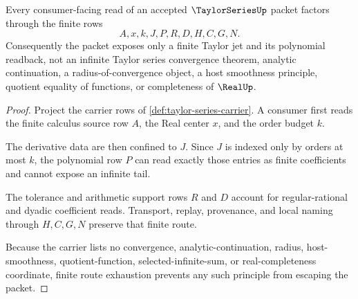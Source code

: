 \begin{theorem}
\label{thm:taylor-series-finite-jet-nonescape}
Every consumer-facing read of an accepted $\TaylorSeriesUp$ packet factors through the finite rows
$$
A,x,k,J,P,R,D,H,C,G,N .
$$
Consequently the packet exposes only a finite Taylor jet and its polynomial readback, not an infinite Taylor series convergence theorem, analytic continuation, a radius-of-convergence object, a host smoothness principle, quotient equality of functions, or completeness of $\RealUp$.
\end{theorem}
\begin{proof}
Project the carrier rows of \autoref{def:taylor-series-carrier}. A consumer first reads the finite calculus source row $A$, the Real center $x$, and the order budget $k$.

The derivative data are then confined to $J$. Since $J$ is indexed only by orders at most $k$, the polynomial row $P$ can read exactly those entries as finite coefficients and cannot expose an infinite tail.

The tolerance and arithmetic support rows $R$ and $D$ account for regular-rational and dyadic coefficient reads. Transport, replay, provenance, and local naming through $H,C,G,N$ preserve that finite route.

Because the carrier lists no convergence, analytic-continuation, radius, host-smoothness, quotient-function, selected-infinite-sum, or real-completeness coordinate, finite route exhaustion prevents any such principle from escaping the packet.
\end{proof}


\begin{closurestatus}{\TaylorSeriesUp}
  \theoryclosure{\seedClosure}
  \formalstatus{\unformalizedV}
\end{closurestatus}
